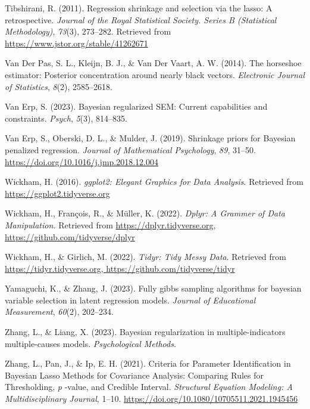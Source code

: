 \documentclass[
  man, donotrepeattitle,floatsintext]{apa6}
\newlength{\cslhangindent}
\newlength{\cslentryspacingunit} %
\newenvironment{CSLReferences}[2] %
 {%
  \setlength{\parindent}{0pt}
  \ifodd #1
  \let\oldpar\par
  \def\par{\hangindent=\cslhangindent\oldpar}
  \fi
  \setlength{\parskip}{#2\cslentryspacingunit}
 }%
 {}
\begin{document}
\begin{CSLReferences}{1}{0}
\leavevmode{}%
Tibshirani, R. (2011). Regression shrinkage and selection via the lasso: A retrospective. \emph{Journal of the Royal Statistical Society. Series B (Statistical Methodology)}, \emph{73}(3), 273--282. Retrieved from \url{https://www.jstor.org/stable/41262671}

\leavevmode{}%
Van Der Pas, S. L., Kleijn, B. J., \& Van Der Vaart, A. W. (2014). The horseshoe estimator: {Posterior} concentration around nearly black vectors. \emph{Electronic Journal of Statistics}, \emph{8}(2), 2585--2618.

\leavevmode{}%
Van Erp, S. (2023). Bayesian regularized SEM: Current capabilities and constraints. \emph{Psych}, \emph{5}(3), 814--835.

\leavevmode{}%
Van Erp, S., Oberski, D. L., \& Mulder, J. (2019). Shrinkage priors for {Bayesian} penalized regression. \emph{Journal of Mathematical Psychology}, \emph{89}, 31--50. \url{https://doi.org/10.1016/j.jmp.2018.12.004}

\leavevmode{}%
Wickham, H. (2016). \emph{ggplot2: {Elegant} {Graphics} for {Data} {Analysis}}. Retrieved from \url{https://ggplot2.tidyverse.org}

\leavevmode{}%
Wickham, H., François, R., \& Müller, K. (2022). \emph{Dplyr: {A} {Grammer} of {Data} {Manipulation}.} Retrieved from \href{https://dplyr.tidyverse.org,\%20https://github.com/tidyverse/dplyr}{https://dplyr.tidyverse.org, https://github.com/tidyverse/dplyr}

\leavevmode{}%
Wickham, H., \& Girlich, M. (2022). \emph{Tidyr: {Tidy} {Messy} {Data}}. Retrieved from \href{https://tidyr.tidyverse.org,\%20https://github.com/tidyverse/tidyr}{https://tidyr.tidyverse.org, https://github.com/tidyverse/tidyr}

\leavevmode{}%
Yamaguchi, K., \& Zhang, J. (2023). Fully gibbs sampling algorithms for bayesian variable selection in latent regression models. \emph{Journal of Educational Measurement}, \emph{60}(2), 202--234.

\leavevmode{}%
Zhang, L., \& Liang, X. (2023). Bayesian regularization in multiple-indicators multiple-causes models. \emph{Psychological Methods}.

\leavevmode{}%
Zhang, L., Pan, J., \& Ip, E. H. (2021). Criteria for {Parameter} {Identification} in {Bayesian} {Lasso} {Methods} for {Covariance} {Analysis}: {Comparing} {Rules} for {Thresholding}, \emph{p} -value, and {Credible} {Interval}. \emph{Structural Equation Modeling: A Multidisciplinary Journal}, 1--10. \url{https://doi.org/10.1080/10705511.2021.1945456}

\end{CSLReferences}
\end{document}
